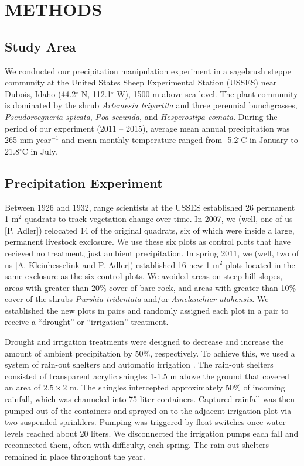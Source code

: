 \documentclass[fleqn,10pt,lineno]{wlpeerj} %
\begin{document}
\section{METHODS}\label{methods}

\subsection{Study Area}\label{study-area}

We conducted our precipitation manipulation experiment in a sagebrush
steppe community at the United States Sheep Experimental Station (USSES)
near Dubois, Idaho (44.2\(^{\circ}\) N, 112.1\(^{\circ}\) W), 1500 m
above sea level. The plant community is dominated by the shrub
\emph{Artemesia tripartita} and three perennial bunchgrasses,
\emph{Pseudoroegneria spicata}, \emph{Poa secunda}, and
\emph{Hesperostipa comata}. During the period of our experiment (2011 --
2015), average mean annual precipitation was 265 mm
year\(\phantom{}^{-1}\) and mean monthly temperature ranged from
-5.2\(^{\circ}\)C in January to 21.8\(^{\circ}\)C in July.

\subsection{Precipitation Experiment}\label{precipitation-experiment}

Between 1926 and 1932, range scientists at the USSES established 26
permanent 1 m\(^2\) quadrats to track vegetation change over time. In
2007, we (well, one of us {[}P. Adler{]}) relocated 14 of the original
quadrats, six of which were inside a large, permanent livestock
exclosure. We use these six plots as control plots that have recieved no
treatment, just ambient precipitation. In spring 2011, we (well, two of
us {[}A. Kleinhesselink and P. Adler{]}) established 16 new 1 m\(^2\)
plots located in the same exclosure as the six control plots. We avoided
areas on steep hill slopes, areas with greater than 20\% cover of bare
rock, and areas with greater than 10\% cover of the shrubs \emph{Purshia
tridentata} and/or \emph{Amelanchier utahensis}. We established the new
plots in pairs and randomly assigned each plot in a pair to receive a
``drought'' or ``irrigation'' treatment.

Drought and irrigation treatments were designed to decrease and increase
the amount of ambient precipitation by 50\%, respectively. To achieve
this, we used a system of rain-out shelters and automatic irrigation
\citep{Gherardi2013}. The rain-out shelters consisted of transparent
acrylic shingles 1-1.5 m above the ground that covered an area of
\(2.5\times2\) m. The shingles intercepted approximately 50\% of
incoming rainfall, which was channeled into 75 liter containers.
Captured rainfall was then pumped out of the containers and sprayed on
to the adjacent irrigation plot via two suspended sprinklers. Pumping
was triggered by float switches once water levels reached about 20
liters. We disconnected the irrigation pumps each fall and reconnected
them, often with difficulty, each spring. The rain-out shelters remained
in place throughout the year.
\end{document}
